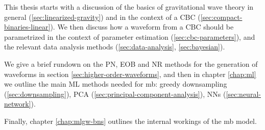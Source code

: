 \documentclass[main.tex]{subfiles}
\begin{document}
This thesis starts with a discussion of the basics of gravitational wave theory in general (\ref{sec:linearized-gravity}) and in the context of a \ac{CBC} (\ref{sec:compact-binaries-linear}).
We then discuss how a waveform from a \ac{CBC} should be parametrized in the context of parameter estimation (\ref{sec:cbc-parameters}), and the relevant data analysis methods (\ref{sec:data-analysis}, \ref{sec:bayesian}). 

We give a brief rundown on the \ac{PN}, \ac{EOB} and \ac{NR} methods for the generation of waveforms in section \ref{sec:higher-order-waveforms}, and then in chapter \ref{chap:ml} we outline the main \ac{ML} methods needed for \ac{mb}: greedy downsampling (\ref{sec:downsampling}), \ac{PCA} (\ref{sec:principal-component-analysis}), \acp{NN} (\ref{sec:neural-network}). 

Finally, chapter \ref{chap:mlgw-bns} outlines the internal workings of the \ac{mb} model. 
\end{document}
